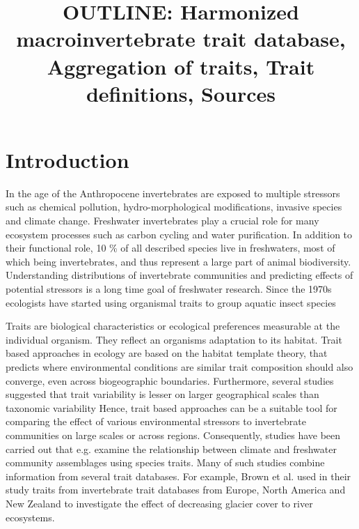 \documentclass{article}
\title{ OUTLINE: Harmonized macroinvertebrate trait database, Aggregation of traits, Trait definitions, Sources }
\author{}%
\date{}%
\begin{document}
\maketitle

\section{Introduction}


In the age of the Anthropocene invertebrates are exposed to multiple stressors such 
as chemical pollution, hydro-morphological modifications, invasive species and climate change. %
Freshwater invertebrates play a crucial role for many ecosystem processes such as 
carbon cycling and water purification. In addition to their functional role, 10 \% of all 
described species live in freshwaters, most of which being invertebrates, and thus represent a
large part of animal biodiversity.
Understanding distributions of invertebrate communities and predicting effects of 
potential stressors is a long time goal of freshwater research. Since the 1970s 
ecologists have started using organismal traits to group aquatic insect species %

Traits are biological characteristics or ecological preferences measurable at the 
individual organism. %
They reflect an organisms adaptation to its habitat. Trait based approaches in 
ecology are based on the habitat template theory, that predicts where environmental conditions
are similar trait composition should also converge, even across biogeographic boundaries. %
Furthermore, several studies suggested that trait variability is lesser on larger geographical
scales than taxonomic variability %
Hence, trait based approaches can be a suitable tool for comparing the effect of various 
environmental stressors to invertebrate communities on large scales or across regions. 
Consequently, studies have been carried out that e.g. examine the relationship between climate
and freshwater community assemblages using species traits. %
Many of such studies combine information from several trait databases. For example, 
Brown et al. used in their study traits from invertebrate trait databases from
Europe, North America and New Zealand to investigate the effect of decreasing glacier cover
to river ecosystems. %
\end{document}
